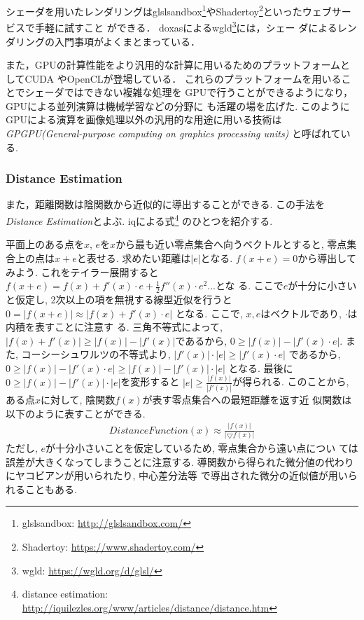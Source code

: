 シェーダを用いたレンダリングはglslsandbox\footnote{glslsandbox:
\url{http://glslsandbox.com/}}やShadertoy\footnote{Shadertoy:
\url{https://www.shadertoy.com/}}といったウェブサービスで手軽に試すこと
ができる．
doxasによるwgld\footnote{wgld: \url{https://wgld.org/d/glsl/}}には，シェー
ダによるレンダリングの入門事項がよくまとまっている．

また，GPUの計算性能をより汎用的な計算に用いるためのプラットフォームとしてCUDA
やOpenCLが登場している．
これらのプラットフォームを用いることでシェーダではできない複雑な処理を
GPUで行うことができるようになり，GPUによる並列演算は機械学習などの分野に
も活躍の場を広げた.
このようにGPUによる演算を画像処理以外の汎用的な用途に用いる技術は
\textit{GPGPU(General-purpose computing on graphics processing units)}
と呼ばれている.

\subsubsection{Distance Estimation}

また，距離関数は陰関数から近似的に導出することができる.
この手法を\textit{Distance Estimation}とよぶ.
iqによる式\footnote{distance estimation:
\url{http://iquilezles.org/www/articles/distance/distance.htm}}
のひとつを紹介する.

平面上のある点を$x$, $e$を$x$から最も近い零点集合へ向うベクトルとすると,
零点集合上の点は$x + e$と表せる.
求めたい距離は$|e|$となる.
$f(x + e) = 0$から導出してみよう.
これをテイラー展開すると
$f(x + e) = f(x) + f'(x) \cdot e  + \frac{1}{2}f''(x) \cdot e^2 ...$とな
る. ここで$e$が十分に小さいと仮定し, 2次以上の項を無視する線型近似を行うと
$0=|f(x + e)| \approx |f(x) + f'(x) \cdot e|$
となる. ここで, $x, e$はベクトルであり, $\cdot$は内積を表すことに注意す
る.
三角不等式によって, $| f(x) + f'(x) | \geq |f(x)| - |f'(x)|$であるから,
$0 \geq |f(x)| - |f'(x) \cdot e|$.
また, コーシーシュワルツの不等式より,
$|f'(x)| \cdot |e| \geq | f'(x)\cdot e|$
であるから,
$0 \geq |f(x)| - |f'(x) \cdot e| \geq |f(x)| - |f'(x)| \cdot |e|$
となる.
最後に$0 \geq |f(x)| - |f'(x)| \cdot |e|$を変形すると
$|e| \geq \frac{|f(x)|}{|f'(x)|}$が得られる.
このことから, ある点$x$に対して, 陰関数$f(x)$が表す零点集合への最短距離を返す近
似関数は以下のように表すことができる.
\begin{align*}
 DistanceFunction(x) \approx \frac{|f(x)|}{|\bigtriangledown f(x)|}
\end{align*}
ただし, $e$が十分小さいことを仮定しているため, 零点集合から遠い点につい
ては誤差が大きくなってしまうことに注意する.
導関数から得られた微分値の代わりにヤコビアンが用いられたり, 中心差分法等
で導出された微分の近似値が用いられることもある.

